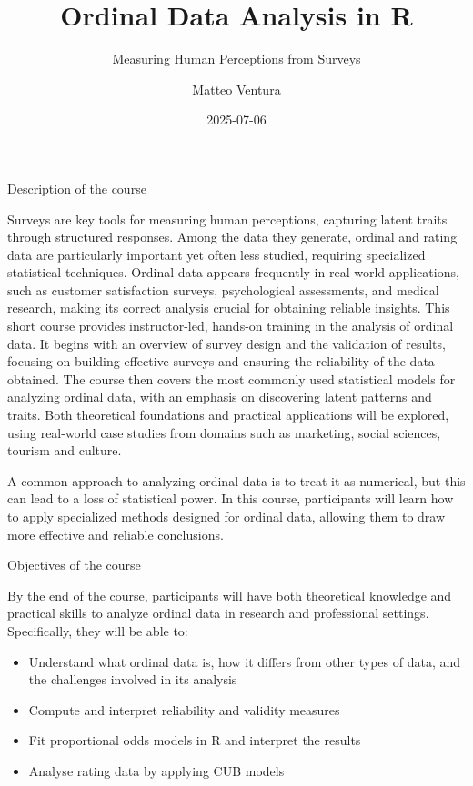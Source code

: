 \documentclass[
  letterpaper,
  DIV=11,
  numbers=noendperiod]{scrartcl}
\title{Ordinal Data Analysis in R}
\subtitle{Measuring Human Perceptions from Surveys}
\author{Matteo Ventura}
\date{2025-07-06}
\providecommand{\tightlist}{%
  \setlength{\itemsep}{0pt}\setlength{\parskip}{0pt}}\usepackage{longtable,booktabs,array}
\begin{document}
\maketitle
\ifdefined\Shaded\renewenvironment{Shaded}{\begin{tcolorbox}[frame hidden, interior hidden, sharp corners, borderline west={3pt}{0pt}{shadecolor}, breakable, boxrule=0pt, enhanced]}{\end{tcolorbox}}\fi

Description of the course

Surveys are key tools for measuring human perceptions, capturing latent
traits through structured responses. Among the data they generate,
ordinal and rating data are particularly important yet often less
studied, requiring specialized statistical techniques. Ordinal data
appears frequently in real-world applications, such as customer
satisfaction surveys, psychological assessments, and medical research,
making its correct analysis crucial for obtaining reliable insights.
This short course provides instructor-led, hands-on training in the
analysis of ordinal data. It begins with an overview of survey design
and the validation of results, focusing on building effective surveys
and ensuring the reliability of the data obtained. The course then
covers the most commonly used statistical models for analyzing ordinal
data, with an emphasis on discovering latent patterns and traits. Both
theoretical foundations and practical applications will be explored,
using real-world case studies from domains such as marketing, social
sciences, tourism and culture.

A common approach to analyzing ordinal data is to treat it as numerical,
but this can lead to a loss of statistical power. In this course,
participants will learn how to apply specialized methods designed for
ordinal data, allowing them to draw more effective and reliable
conclusions.

Objectives of the course

By the end of the course, participants will have both theoretical
knowledge and practical skills to analyze ordinal data in research and
professional settings. Specifically, they will be able to:

\begin{itemize}
\tightlist
\item
  Understand what ordinal data is, how it differs from other types of
  data, and the challenges involved in its analysis
\item
  Compute and interpret reliability and validity measures
\item
  Fit proportional odds models in R and interpret the results
\item
  Analyse rating data by applying CUB models
\end{itemize}
\end{document}
